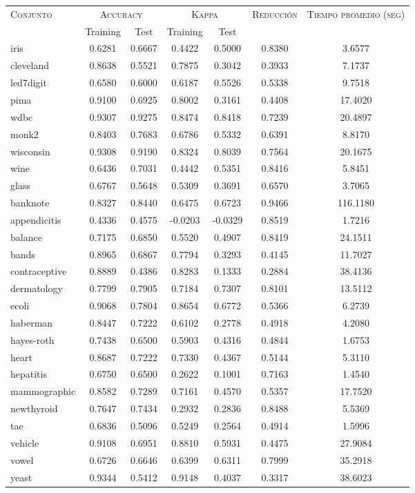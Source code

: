 \begin{table}[]
\centering
\begin{tabular}{l c c c c c c}
\hline
\multirow{2}{*}{\textsc{Conjunto}}
	& \multicolumn{2}{c}{\textsc{Accuracy}}
	& \multicolumn{2}{c}{\textsc{Kappa}}
	& \textsc{Reducción}
	& \textsc{Tiempo promedio (seg)} \\
	& Training & Test
	& Training & Test \\ 
\hline
\hline

iris & 0.6281 & 0.6667 & 0.4422 & 0.5000 & 0.8380 & 3.6577 \\
cleveland & 0.8638 & 0.5521 & 0.7875 & 0.3042 & 0.3933 & 7.1737 \\
led7digit & 0.6580 & 0.6000 & 0.6187 & 0.5526 & 0.5338 & 9.7518 \\
pima & 0.9100 & 0.6925 & 0.8002 & 0.3161 & 0.4408 & 17.4020 \\
wdbc & 0.9307 & 0.9275 & 0.8474 & 0.8418 & 0.7239 & 20.4897 \\
monk2 & 0.8403 & 0.7683 & 0.6786 & 0.5332 & 0.6391 & 8.8170 \\
wisconsin & 0.9308 & 0.9190 & 0.8324 & 0.8039 & 0.7564 & 20.1675 \\
wine & 0.6436 & 0.7031 & 0.4442 & 0.5351 & 0.8416 & 5.8451 \\
glass & 0.6767 & 0.5648 & 0.5309 & 0.3691 & 0.6570 & 3.7065 \\
banknote & 0.8327 & 0.8440 & 0.6475 & 0.6723 & 0.9466 & 116.1180 \\
appendicitis & 0.4336 & 0.4575 & -0.0203 & -0.0329 & 0.8519 & 1.7216 \\
balance & 0.7175 & 0.6850 & 0.5520 & 0.4907 & 0.8419 & 24.1511 \\
bands & 0.8965 & 0.6867 & 0.7794 & 0.3293 & 0.4145 & 11.7027 \\
contraceptive & 0.8889 & 0.4386 & 0.8283 & 0.1333 & 0.2884 & 38.4136 \\
dermatology & 0.7799 & 0.7905 & 0.7184 & 0.7307 & 0.8101 & 13.5112 \\
ecoli & 0.9068 & 0.7804 & 0.8654 & 0.6772 & 0.5366 & 6.2739 \\
haberman & 0.8447 & 0.7222 & 0.6102 & 0.2778 & 0.4918 & 4.2080 \\
hayes-roth & 0.7438 & 0.6500 & 0.5903 & 0.4316 & 0.4844 & 1.6753 \\
heart & 0.8687 & 0.7222 & 0.7330 & 0.4367 & 0.5144 & 5.3110 \\
hepatitis & 0.6750 & 0.6500 & 0.2622 & 0.1001 & 0.7163 & 1.4540 \\
mammographic & 0.8582 & 0.7289 & 0.7161 & 0.4570 & 0.5357 & 17.7520 \\
newthyroid & 0.7647 & 0.7434 & 0.2932 & 0.2836 & 0.8488 & 5.5369 \\
tae & 0.6836 & 0.5096 & 0.5249 & 0.2564 & 0.4914 & 1.5996 \\
vehicle & 0.9108 & 0.6951 & 0.8810 & 0.5931 & 0.4475 & 27.9084 \\
vowel & 0.6726 & 0.6646 & 0.6399 & 0.6311 & 0.7999 & 35.2918 \\
yeast & 0.9344 & 0.5412 & 0.9148 & 0.4037 & 0.3317 & 38.6023 \\


\end{tabular}
\end{table}
